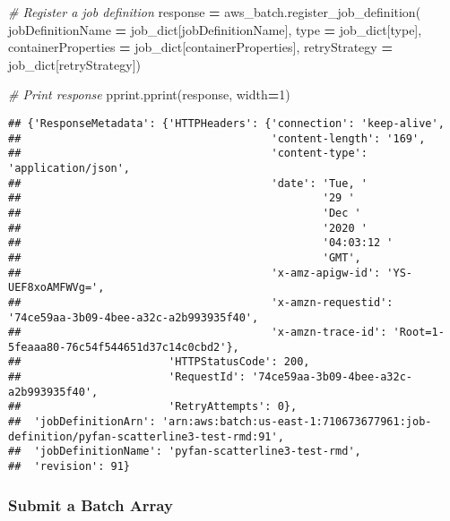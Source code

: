 \documentclass[
]{book}
\newenvironment{Shaded}{\begin{snugshade}}{\end{snugshade}}
\newcommand{\BuiltInTok}[1]{#1}
\newcommand{\CommentTok}[1]{\textcolor[rgb]{0.56,0.35,0.01}{\textit{#1}}}
\newcommand{\DecValTok}[1]{\textcolor[rgb]{0.00,0.00,0.81}{#1}}
\newcommand{\NormalTok}[1]{#1}
\newcommand{\OperatorTok}[1]{\textcolor[rgb]{0.81,0.36,0.00}{\textbf{#1}}}
\newcommand{\StringTok}[1]{\textcolor[rgb]{0.31,0.60,0.02}{#1}}
\begin{document}
\begin{Shaded}
\begin{Highlighting}[]
\CommentTok{\# Register a job definition}
\NormalTok{response }\OperatorTok{=}\NormalTok{ aws\_batch.register\_job\_definition(}
\NormalTok{        jobDefinitionName }\OperatorTok{=}\NormalTok{ job\_dict[}\StringTok{\textquotesingle{}jobDefinitionName\textquotesingle{}}\NormalTok{],}
        \BuiltInTok{type} \OperatorTok{=}\NormalTok{ job\_dict[}\StringTok{\textquotesingle{}type\textquotesingle{}}\NormalTok{],}
\NormalTok{        containerProperties }\OperatorTok{=}\NormalTok{ job\_dict[}\StringTok{\textquotesingle{}containerProperties\textquotesingle{}}\NormalTok{],}
\NormalTok{        retryStrategy }\OperatorTok{=}\NormalTok{ job\_dict[}\StringTok{\textquotesingle{}retryStrategy\textquotesingle{}}\NormalTok{])}

\CommentTok{\# Print response}
\NormalTok{pprint.pprint(response, width}\OperatorTok{=}\DecValTok{1}\NormalTok{)}
\end{Highlighting}
\end{Shaded}

\begin{verbatim}
## {'ResponseMetadata': {'HTTPHeaders': {'connection': 'keep-alive',
##                                       'content-length': '169',
##                                       'content-type': 'application/json',
##                                       'date': 'Tue, '
##                                               '29 '
##                                               'Dec '
##                                               '2020 '
##                                               '04:03:12 '
##                                               'GMT',
##                                       'x-amz-apigw-id': 'YS-UEF8xoAMFWVg=',
##                                       'x-amzn-requestid': '74ce59aa-3b09-4bee-a32c-a2b993935f40',
##                                       'x-amzn-trace-id': 'Root=1-5feaaa80-76c54f544651d37c14c0cbd2'},
##                       'HTTPStatusCode': 200,
##                       'RequestId': '74ce59aa-3b09-4bee-a32c-a2b993935f40',
##                       'RetryAttempts': 0},
##  'jobDefinitionArn': 'arn:aws:batch:us-east-1:710673677961:job-definition/pyfan-scatterline3-test-rmd:91',
##  'jobDefinitionName': 'pyfan-scatterline3-test-rmd',
##  'revision': 91}
\end{verbatim}

\hypertarget{submit-a-batch-array}{%
\subsubsection{Submit a Batch Array}\label{submit-a-batch-array}}
\end{document}
